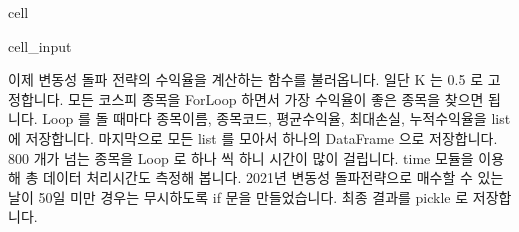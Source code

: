 \documentclass[letterpaper,10pt,english]{jupyterBook}
\begin{document}
\begin{sphinxuseclass}{cell}\begin{sphinxVerbatimInput}

\begin{sphinxuseclass}{cell_input}
\begin{sphinxVerbatim}[commandchars=\\\{\}]
  \PYG{p}{[}\PYG{p}{[}\PYG{p}{]}\PYG{p}{]}\PYG{p}{[}\PYG{p}{[}\PYG{p}{]}\PYG{p}{]}
  
\end{sphinxVerbatim}

\end{sphinxuseclass}\end{sphinxVerbatimInput}

\end{sphinxuseclass}
\sphinxAtStartPar
 이제 변동성 돌파 전략의 수익율을 계산하는 함수를 불러옵니다. 일단 K 는 0.5 로 고정합니다. 모든 코스피 종목을 For\sphinxhyphen{}Loop 하면서 가장 수익율이 좋은 종목을 찾으면 됩니다. Loop 를 돌 때마다 종목이름, 종목코드, 평균수익율, 최대손실, 누적수익율을 list 에 저장합니다. 마지막으로 모든 list 를 모아서 하나의 DataFrame 으로 저장합니다. 800 개가 넘는 종목을 Loop 로 하나 씩 하니 시간이 많이 걸립니다. time 모듈을 이용해 총 데이터 처리시간도 측정해 봅니다. 2021년 변동성 돌파전략으로 매수할 수 있는 날이 50일 미만 경우는 무시하도록 if 문을 만들었습니다. 최종 결과를 pickle 로 저장합니다.
\end{document}
